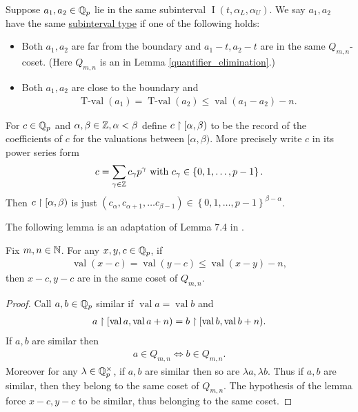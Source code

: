 \documentclass{amsart}
\newcommand{\curly}[1]{\left\{#1\right\}}
\DeclareMathOperator{\val}{val}
\DeclareMathOperator{\vval}{val}
\DeclareMathOperator{\tval}{T-val}
\DeclareMathOperator{\inti}{I}
\newcommand{\defn}{\ul}
\newcommand{\interval}{\inti(t, \alpha_L, \alpha_U)}
\begin{document}
\begin{Definition}
  Suppose $a_1, a_2 \in \mathbb{Q}_p$ lie in the same subinterval $\interval$.
  We say $a_1, a_2$ have the same \defn{subinterval type} if one of the following holds:
  \begin{itemize}
  \item Both $a_1, a_2$ are far from the boundary and $a_1 - t, a_2 - t$ are in the same $Q_{m,n}$-coset.
    (Here $Q_{m,n}$ is an in Lemma \ref{quantifier_elimination}.)
  \item Both $a_1, a_2$ are close to the boundary and 
    \begin{align*}
	  \tval(a_1) = \tval(a_2) \leq \vval(a_1 - a_2) - n.
    \end{align*}
  \end{itemize}      
\end{Definition}


\begin{Definition}
	For $c \in \mathbb{Q}_p$ and $\alpha, \beta \in \mathbb{Z}, \alpha < \beta$ define $c \upharpoonright [\alpha, \beta)$
  to be the record of the coefficients of $c$ for the valuations between $[\alpha, \beta)$.
  More precisely write $c$ in its power series form
  \begin{align*}
    c = \sum_{\gamma \in \Z} c_\gamma p^\gamma \text{ with } c_\gamma \in \curly{0,1, \ldots, p-1}.
  \end{align*}
  Then $c \upharpoonright [\alpha, \beta)$ is just $(c_\alpha, c_{\alpha+1}, \ldots c_{\beta - 1}) \in \curly{0,1, \ldots, p-1}^{\beta - \alpha}$.
\end{Definition}

The following lemma is an adaptation of Lemma 7.4 in \cite{density}.
\begin{Lemma} \label{distance}
  Fix $m,n \in \mathbb{N}$.
  For any $x,y,c \in \mathbb{Q}_p$, if
  \begin{align*}
    \val (x - c) = \val (y - c) \leq \val (x - y) - n,
  \end{align*}
  then $x - c, y - c$ are in the same coset of $Q_{m,n}$.
\end{Lemma}
\begin{proof}
  Call $a,b \in \mathbb{Q}_p$ similar if $\val a = \val b$ and
  \begin{align*}
    a \midr [\val a, \val a + n) = b \midr [\val b, \val b + n).
  \end{align*}
  If $a,b$ are similar then
  \begin{align*}
    a \in Q_{m,n} \iff b \in Q_{m,n}.
  \end{align*}
  Moreover for any $\lambda \in \mathbb{Q}_p^\times$, if $a,b$ are similar then so are $\lambda a, \lambda b$.
  Thus if $a,b$ are similar, then they belong to the same coset of $Q_{m,n}$.
  The hypothesis of the lemma force $x - c, y - c$ to be similar, thus belonging to the same coset.
\end{proof} 
\end{document}

